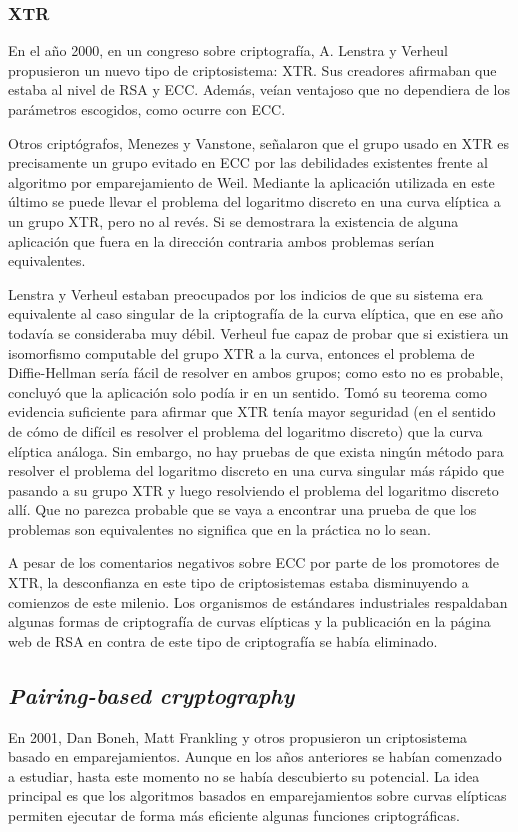 \documentclass[
  a4paper,
  12pt,
  spanish,
]{scrartcl}
\begin{document}
\subsubsection{XTR}

En el año 2000, en un congreso sobre criptografía, A. Lenstra y Verheul propusieron un nuevo tipo de criptosistema: XTR. Sus creadores afirmaban que estaba al nivel de RSA y ECC. Además, veían ventajoso que no dependiera de los parámetros escogidos, como ocurre con ECC.

Otros criptógrafos, Menezes y Vanstone, señalaron que el grupo usado en XTR es precisamente un grupo evitado en ECC por las debilidades existentes frente al algoritmo por emparejamiento de Weil. Mediante la aplicación utilizada en este último se puede llevar el problema del logaritmo discreto en una curva elíptica a un grupo XTR, pero no al revés. Si se demostrara la existencia de alguna aplicación que fuera en la dirección contraria ambos problemas serían equivalentes. 

Lenstra y Verheul estaban preocupados por los indicios de que su sistema era equivalente al caso singular de la criptografía de la curva elíptica, que en ese año todavía se consideraba muy débil. Verheul fue capaz de probar que si existiera un isomorfismo computable del grupo XTR a la curva, entonces el problema de Diffie-Hellman sería fácil de resolver en ambos grupos; como esto no es probable, concluyó que la aplicación solo podía ir en un sentido. Tomó su teorema como evidencia suficiente para afirmar que XTR tenía mayor seguridad (en el sentido de cómo de difícil es resolver el problema del logaritmo discreto) que la curva elíptica análoga. Sin embargo, no hay pruebas de que exista ningún método para resolver el problema del logaritmo discreto  en una curva singular más rápido que pasando a su grupo XTR y luego resolviendo el problema del logaritmo discreto allí. Que no parezca probable que se vaya a encontrar una prueba de que los problemas son equivalentes no significa que en la práctica no lo sean.

A pesar de los comentarios negativos sobre ECC por parte de los promotores de XTR, la desconfianza en este tipo de criptosistemas estaba disminuyendo a comienzos de este milenio. Los organismos de estándares industriales respaldaban algunas formas de criptografía de curvas elípticas y la publicación en la página web de RSA en contra de este tipo de criptografía se había eliminado.

\subsection{\textit{Pairing-based cryptography}}
En 2001, Dan Boneh, Matt Frankling y otros propusieron un criptosistema basado en emparejamientos. Aunque en los años anteriores se habían comenzado a estudiar, hasta este momento no se había descubierto su potencial. La idea principal es que los algoritmos basados en emparejamientos sobre curvas elípticas permiten ejecutar de forma más eficiente algunas funciones criptográficas.
\end{document}

